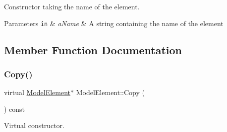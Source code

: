 Constructor taking the name of the element. 
\begin{DoxyParams}[1]{Parameters}
\mbox{\tt in}  & {\em a\+Name} & A string containing the name of the element \\
\hline
\end{DoxyParams}


\subsection{Member Function Documentation}
\mbox{\label{classModelElement_ac3ca26d649bd86a0f31a58ae09941429}} 
\subsubsection{\texorpdfstring{Copy()}{Copy()}}
{\footnotesize\ttfamily virtual \hyperlink{classModelElement}{Model\+Element}$\ast$ Model\+Element\+::\+Copy (\begin{DoxyParamCaption}{ }\end{DoxyParamCaption}) const\hspace{0.3cm}{\ttfamily [pure virtual]}}

Virtual constructor. 

